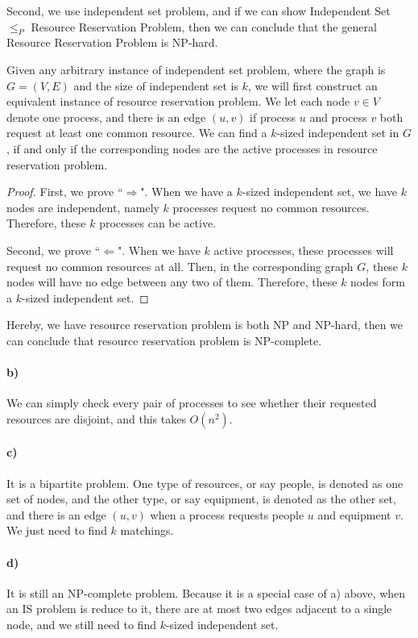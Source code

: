 \documentclass[letter,12pt]{article}
\begin{document}
Second, we use independent set problem, and if we can show Independent Set $\le_P$ 
Resource Reservation Problem, then we  can conclude that the general Resource 
Reservation Problem is NP-hard.

Given any arbitrary instance of independent set problem, where the graph is $G=(V, E)$
and the size of independent set is $k$, we will first construct an equivalent instance
of resource reservation problem. We let each node $v \in V$ denote one process, and
there is an edge $(u, v)$ if process $u$ and process $v$ both request at least one
common resource. We can find a $k$-sized independent set in $G$, if and only if  
the corresponding nodes are the active processes in resource reservation problem.
\begin{proof}
First, we prove ``$\Rightarrow$". When we have a $k$-sized independent set, we
have $k$ nodes are independent, namely $k$ processes request no common resources.
Therefore, these $k$ processes can be active.

Second, we prove ``$\Leftarrow$". When we have $k$ active processes, these 
processes will request no common resources at all. Then, in the corresponding graph
$G$, these $k$ nodes will have no edge between any two of them. Therefore, these
$k$ nodes form a $k$-sized independent set.
\end{proof}

Hereby, we have resource reservation problem is both NP and NP-hard, then we can 
conclude that resource reservation problem is NP-complete.

\paragraph*{b)}
We can simply check every pair of processes to see whether their requested resources
are disjoint, and this takes $O(n^2)$.

\paragraph*{c)}
It is a bipartite problem. One type of resources, or say people, is denoted as one set of 
nodes, and the other type, or say equipment, is denoted as the other set, and there is 
an edge $(u, v)$ when a process requests people $u$ and equipment $v$. We just need 
to find $k$ matchings.
\paragraph*{d)}
It is still an NP-complete problem. Because it is a special case of a) above, when an IS 
problem is reduce to it, there are at most two edges adjacent to a single node, and we
still need to find $k$-sized independent set.
\end{document}
